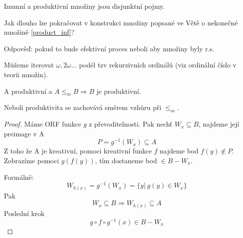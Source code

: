 \begin{note}
	Imunní a produktivní množiny jsou disjunktní pojmy.
\end{note}

\begin{amendment}
	Jak dlouho lze pokračovat v konstrukci množiny popsané ve Větě o nekonečné množině \cref{product_inf}?

	Odpověď: pokud to bude efektivní proces neboli aby množiny byly r.s.

	Můžeme iterovat $\omega, 2 \omega \ldots$ podél tzv rekurzivních ordinálů (viz ordinální číslo v teorii množin).
\end{amendment}

\begin{lemma}\label{prod_prev}
	A produktivní a $A \leq_m B \Rightarrow B$ je produktivní.

	Neboli produktivita se zachovává směrem vzhůru při $\leq_m$.
\end{lemma}
\begin{proof}
	Máme ORF funkce $g$ z převoditelnosti.
	Pak nechť $W_x \subseteq B$, najdeme její preimage v A
	\[ P = g^{-1}(W_x) \subseteq A \]
	Z toho že A je kreativní, pomoci kreativní funkce $f$ najdeme bod $f(y) \notin P$.
	Zobrazíme pomoci $g(f(y))$, tím dostaneme bod $\in B - W_x$.

	Formálně:
	\[ W_{h(x)} = g^{-1}(W_x) = \{ y |\ g(y) \in W_x \} \]
	Pak
	\[ W_x \subseteq B \Rightarrow W_{h(x)} \subseteq A \]
	Poslední krok
	\[ g \circ f \circ g^{-1} (x) \in B - W_x \]

\end{proof}

